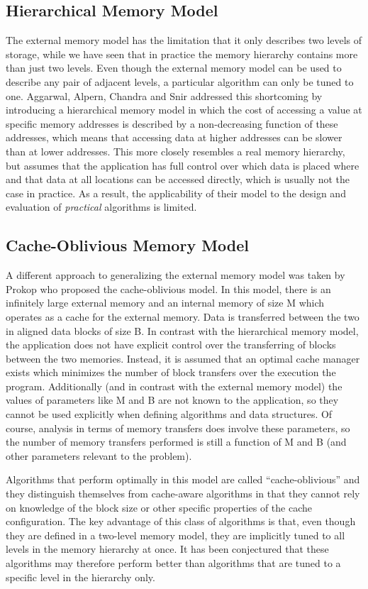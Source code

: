 \documentclass{acm_proc_article-sp}
\begin{document}
\subsection{Hierarchical Memory Model}
The external memory model has the limitation that it only describes two levels of storage, while we have seen that in practice the memory hierarchy contains more than just two levels. Even though the external memory model can be used to describe any pair of adjacent levels, a particular algorithm can only be tuned to one. Aggarwal, Alpern, Chandra and Snir \cite{aggarwal1987mhm} addressed this shortcoming by introducing a hierarchical memory model in which the cost of accessing a value at specific memory addresses is described by a non-decreasing function of these addresses, which means that accessing data at higher addresses can be slower than at lower addresses. This more closely resembles a real memory hierarchy, but assumes that the application has full control over which data is placed where and that data at all locations can be accessed directly, which is usually not the case in practice. As a result, the applicability of their model to the design and evaluation of \emph{practical} algorithms is limited.

\subsection{Cache-Oblivious Memory Model}
A different approach to generalizing the external memory model was taken by Prokop \cite{prokop1999coa} who proposed the cache-oblivious model.
In this model, there is an infinitely large external memory and an internal memory of size M which operates as a cache for the external memory.
Data is transferred between the two in aligned data blocks of size B.
In contrast with the hierarchical memory model, the application does not have explicit control over the transferring of blocks between the two memories.
Instead, it is assumed that an optimal cache manager exists which minimizes the number of block transfers over the execution the program.
Additionally (and in contrast with the external memory model) the values of parameters like M and B are not known to the application, so they cannot be used explicitly when defining algorithms and data structures.
Of course, analysis in terms of memory transfers does involve these parameters, so the number of memory transfers performed is still a function of M and B (and other parameters relevant to the problem).

Algorithms that perform optimally in this model are called ``cache-oblivious'' and they distinguish themselves from cache-aware algorithms in that they cannot rely on knowledge of the block size or other specific properties of the cache configuration. The key advantage of this class of algorithms is that, even though they are defined in a two-level memory model, they are implicitly tuned to all levels in the memory hierarchy at once. It has been conjectured that these algorithms may therefore perform better than algorithms that are tuned to a specific level in the hierarchy only.
\end{document}
